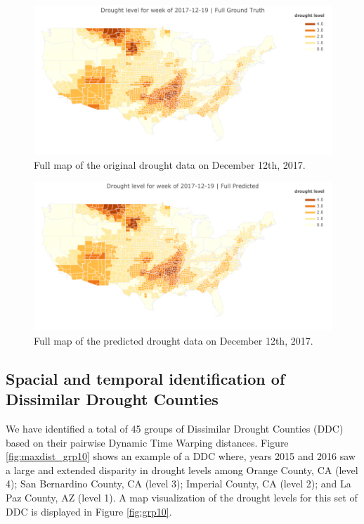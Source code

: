 \documentclass{article}
\begin{document}
\begin{figure}[hbt!]
    \centering
    \includegraphics[width =  \textwidth]{full_ground_truth.png}
    \caption{Full map of the original drought data on December 12th, 2017. }
    \label{fig:full_ground_truth}
\end{figure}


\begin{figure}[hbt!]
    \centering
    \includegraphics[width =  \textwidth]{full_predicted.png}
    \caption{Full map of the predicted drought data on December 12th, 2017.}
    \label{fig:full_predicted}
\end{figure}

\clearpage
\subsection{Spacial and temporal identification of Dissimilar Drought Counties}

We have identified a total of 45 groups of Dissimilar Drought Counties (DDC) based on their pairwise Dynamic Time Warping distances. Figure \ref{fig:maxdist_grp10} shows an example of a DDC where, years 2015 and 2016 saw a large and extended disparity in drought levels among Orange County, CA (level 4); San Bernardino County, CA (level 3); Imperial County, CA (level 2); and La Paz County, AZ (level 1). A map visualization of the drought levels for this set of DDC is displayed in Figure \ref{fig:grp10}. 
\end{document}
